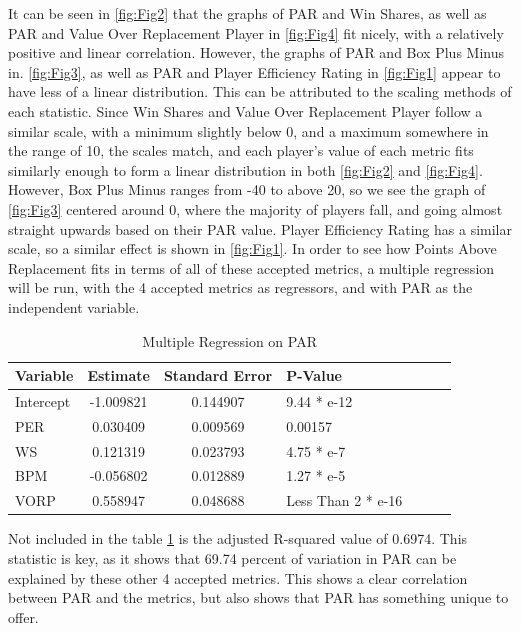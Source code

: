 \documentclass[12pt]{article}
\begin{document}
It can be seen in \ref{fig:Fig2} that the graphs of PAR and Win Shares, as 
well as PAR 
and Value Over Replacement Player in \ref{fig:Fig4}
fit nicely, with a relatively positive and linear correlation. However, the 
graphs of PAR and Box Plus Minus in. \ref{fig:Fig3}, 
as well as PAR and Player Efficiency Rating in \ref{fig:Fig1} appear to 
have less of a 
linear distribution. This can be 
attributed to the scaling methods of each statistic. Since Win Shares and 
Value Over Replacement Player 
follow a similar scale, with a minimum slightly below 0, and a maximum 
somewhere in the range of 10, the 
scales match, and each player's value of each metric fits similarly enough 
to form a linear distribution in both \ref{fig:Fig2} and \ref{fig:Fig4}. 
However, Box Plus Minus ranges from -40 to above 20, so we see the 
graph of \ref{fig:Fig3} centered around 0, where the 
majority of players fall, and going almost straight upwards based on their 
PAR value. Player Efficiency 
Rating has a similar scale, so a similar effect is shown in \ref{fig:Fig1}. In 
order to see 
how Points Above Replacement fits 
in terms of all of these accepted metrics, a multiple regression will be run, 
with the 4 accepted metrics as 
regressors, and with PAR as the independent variable.

\begin{table}[tbp]
  \caption{Multiple Regression on PAR}
  \label{tab:MultipleRegression}
\centering
\begin{tabular}[t]{lccllll}
  \toprule
  Variable &  Estimate & Standard Error & P-Value\\
  \midrule
Intercept & -1.009821  & 0.144907 & 9.44 * e-12\\
PER & 0.030409 & 0.009569 & 0.00157\\
WS & 0.121319 & 0.023793 & 4.75 * e-7\\
BPM & -0.056802 & 0.012889 & 1.27 * e-5\\
VORP & 0.558947 & 0.048688 & Less Than 2 * e-16\\
  \bottomrule
\end{tabular}
\end{table}

Not included in the table \ref{tab:MultipleRegression} is the adjusted 
R-squared 
value of 0.6974. This 
statistic is key, as it shows that 69.74 percent of variation 
in PAR can be explained by these other 4 accepted metrics. This shows a 
clear correlation between PAR 
and the metrics, but also shows that PAR has something unique to offer.
\end{document}
